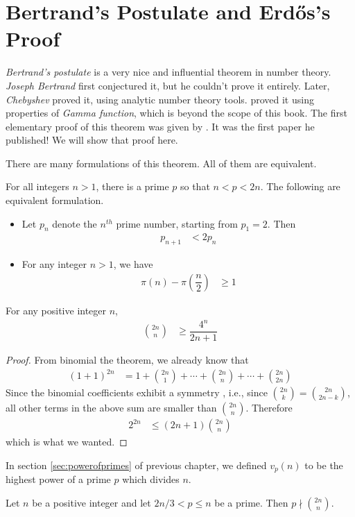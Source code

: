 \documentclass{subfile}
\begin{document}
	\section{Bertrand's Postulate and Erd\H{o}s's Proof}\label{sec:bertrand}
	\label{sec:bertrandspostulate}
	\textit{Bertrand's postulate} is a very nice and influential theorem in number theory. \textit{Joseph Bertrand} first conjectured it, but he couldn't prove it entirely. Later, \textit{Chebyshev} proved it, using analytic number theory tools. \textcite{meher_murty_2013} proved it using properties of \textit{Gamma function}, which is beyond the scope of this book. The first elementary proof of this theorem was given by \textcite{erdos_1932}. It was the first paper he published! We will show that proof here.

	There are many formulations of this theorem. All of them are equivalent.

	\begin{theorem}\label{thm:bertrand}
		For all integers $n>1$, there is a prime $p$ so that $n<p<2n$. The following are equivalent formulation.
		\begin{itemize}
			\item Let $p_n$ denote the $n^{th}$ prime number, starting from $p_1=2$. Then
			\begin{align*}
				p_{n+1}
					& <2p_n
			\end{align*}
			\item For any integer $n >1$, we have
			\begin{align*}
				\pi(n)-\pi\left(\dfrac{n}{2}\right)
					& \geq1
			\end{align*}
		\end{itemize}
	\end{theorem}

	\begin{lemma}\label{lem:bertrand1}
		For any positive integer $n$,
			\begin{align*}
				\binom{2n}{n}
					& \geq\dfrac{4^n}{2n+1}
			\end{align*}
	\end{lemma}

	\begin{proof}
		From binomial the theorem, we already know that
		\begin{align*}
			(1+1)^{2n}
				& = 1+\binom{2n}1+\cdots+\binom{2n}{n}+\cdots+\binom{2n}{2n}
		\end{align*}
		Since the binomial coefficients exhibit a symmetry , i.e., since $\binom{2n}{k}=\binom{2n}{2n-k}$, all other terms in the above sum are smaller than $\binom{2n}{n}$. Therefore
			\begin{align*}
				2^{2n}
					& \leq(2n+1)\binom{2n}n
			\end{align*}
		which is what we wanted.

	\end{proof}
	In section \eqref{sec:powerofprimes} of previous chapter, we defined $v_p(n)$ to be the highest power of a prime $p$ which divides $n$.
	\begin{lemma}\label{lem:bertrand2}
		Let $n$ be a positive integer and let $2n/3<p\leq n$ be a prime. Then $p \nmid \binom{2n}n$.
	\end{lemma}
\end{document}

